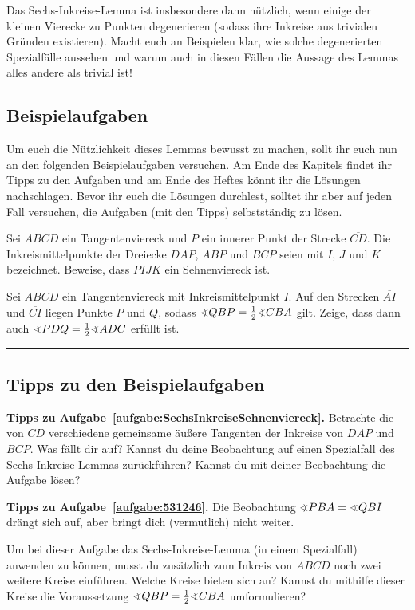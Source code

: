 Das Sechs-Inkreise-Lemma ist insbesondere dann nützlich, wenn einige der kleinen Vierecke zu Punkten degenerieren (sodass ihre Inkreise aus trivialen Gründen existieren). Macht euch an Beispielen klar, wie solche degenerierten Spezialfälle aussehen und warum auch in diesen Fällen die Aussage des Lemmas alles andere als trivial ist!

\subsection*{Beispielaufgaben}
Um euch die Nützlichkeit dieses Lemmas bewusst zu machen, sollt ihr euch nun an den folgenden Beispielaufgaben versuchen. Am Ende des Kapitels findet ihr Tipps zu den Aufgaben und am Ende des Heftes könnt ihr die Lösungen nachschlagen. Bevor ihr euch die Lösungen durchlest, solltet ihr aber auf jeden Fall versuchen, die Aufgaben (mit den Tipps) selbstständig zu lösen.
\begin{aufgabe*}\label{aufgabe:SechsInkreiseSehnenviereck}
	Sei $ABCD$ ein Tangentenviereck und $P$ ein innerer Punkt der Strecke $\overline{CD}$. Die Inkreismittelpunkte der Dreiecke $DAP$, $ABP$ und $BCP$ seien mit $I$, $J$ und $K$ bezeichnet. Beweise, dass $PIJK$ ein Sehnenviereck ist.
\end{aufgabe*}
\begin{aufgabe*}\label{aufgabe:531246}
	Sei $ABCD$ ein Tangentenviereck mit Inkreismittelpunkt $I$. Auf den Strecken $\overline{AI}$ und $\overline{CI}$ liegen Punkte $P$ und $Q$, sodass $\winkel QBP=\frac12\winkel CBA$ gilt. Zeige, dass dann auch $\winkel PDQ=\frac 12\winkel ADC$ erfüllt ist.
\end{aufgabe*}

\vfill\hrule\vspace{-1em}

\subsection*{Tipps zu den Beispielaufgaben}
\textbf{Tipps zu Aufgabe~\ref{aufgabe:SechsInkreiseSehnenviereck}.} Betrachte die von $CD$ verschiedene gemeinsame äußere Tangenten der Inkreise von $DAP$ und $BCP$. Was fällt dir auf? Kannst du deine Beobachtung auf einen Spezialfall des Sechs-Inkreise-Lemmas zurückführen? Kannst du mit deiner Beobachtung die Aufgabe lösen?

\textbf{Tipps zu Aufgabe~\ref{aufgabe:531246}.} Die Beobachtung $\winkel PBA=\winkel QBI$ drängt sich auf, aber bringt dich (vermutlich) nicht weiter.

Um bei dieser Aufgabe das Sechs-Inkreise-Lemma (in einem Spezialfall) anwenden zu können, musst du zusätzlich zum Inkreis von $ABCD$ noch zwei weitere Kreise einführen. Welche Kreise bieten sich an? Kannst du mithilfe dieser Kreise die Voraussetzung $\winkel QBP=\frac12\winkel CBA$ umformulieren?